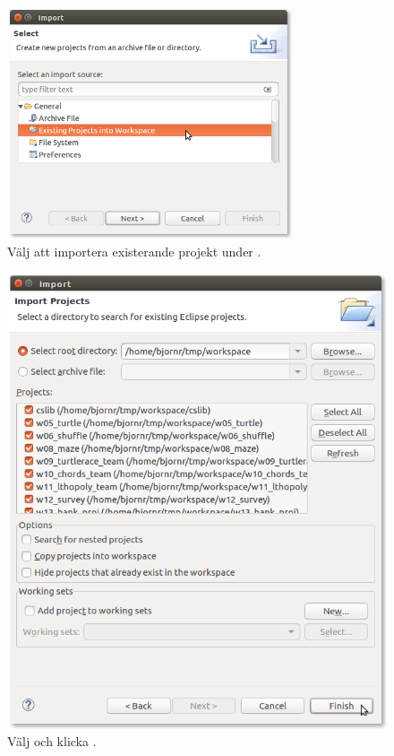 \begin{enumerate}
\begin{figure}[H]
\centering
\includegraphics[width=0.75\textwidth]{../img/eclipse/eclipse-import-existing.png}
\caption {Välj att importera existerande projekt under .}
\label{fig:eclipse:import-existing}
\end{figure}


\begin{figure}[H]
\centering
\includegraphics[width=1.0\textwidth]{../img/eclipse/eclipse-import-projects.png}
\caption {Välj  och klicka .}
\label{fig:eclipse:import-projects}
\end{figure}



\end{enumerate}
